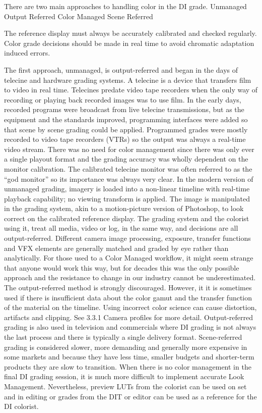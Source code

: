 There are two main approaches to handling color in the DI grade. 
Unmanaged Output Referred 
Color Managed Scene Referred

The reference display must always be accurately calibrated and checked regularly. Color grade decisions should be made in real time to avoid chromatic adaptation induced errors. 

The first approach, unmanaged, is output-referred and began in the days of telecine and hardware grading systems. A telecine is a device that transfers film to video in real time. Telecines predate video tape recorders when the only way of recording or playing back recorded images was to use film. In the early days, recorded programs were broadcast from live telecine transmissions, but as the equipment and the standards improved, programming interfaces were added so that scene by scene grading could be applied. Programmed grades were mostly recorded to video tape recorders (VTRs) so the output was always a real-time video stream. There was no need for color management since there was only ever a single playout format and the grading accuracy was wholly dependent on the monitor calibration. The calibrated telecine monitor was often referred to as the “god monitor” so its importance was always very clear. In the modern version of unmanaged grading, imagery is loaded into a non-linear timeline with real-time playback capability; no viewing transform is applied. The image is manipulated in the grading system, akin to a motion-picture version of Photoshop, to look correct on the calibrated reference display. The grading system and the colorist using it, treat all media, video or log, in the same way, and decisions are all output-referred. Different camera image processing, exposure, transfer functions and VFX elements are generally matched and graded by eye rather than analytically. For those used to a Color Managed workflow, it might seem strange that anyone would work this way, but for decades this was the only possible approach and the resistance to change in our industry cannot be underestimated. The output-referred method is strongly discouraged. However, it it is sometimes used if there is insufficient data about the color gamut and the transfer function of the material on the timeline. Using incorrect color science can cause distortion, artifacts and clipping. See 3.3.1 Camera profiles for more detail. Output-referred grading is also used in television and commercials where DI grading is not always the last process and there is typically a single delivery format. Scene-referred grading is considered slower, more demanding and generally more expensive in some markets and because they have less time, smaller budgets and shorter-term products they are slow to transition. When there is no color management in the final DI grading session, it is much more difficult to implement accurate Look Management. Nevertheless, preview LUTs from the colorist can be used on set and in editing or grades from the DIT or editor can be used as a reference for the DI colorist.

